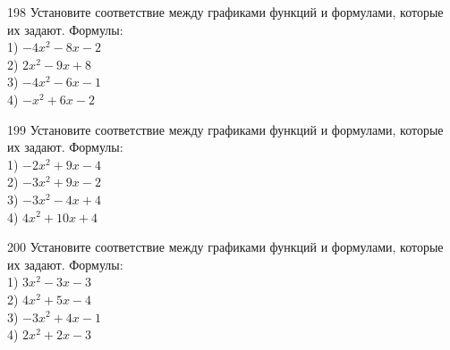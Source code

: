 \documentclass[4apaper]{article}
\begin{document}
\begin{taskBN}{198}
Установите соответствие между графиками функций и формулами, которые их задают. Формулы: \\1) $-4x^2-8x-2$\\2) $2x^2-9x+8$\\3) $-4x^2-6x-1$\\4) $-x^2+6x-2$
\end{taskBN}

\begin{taskBN}{199}
Установите соответствие между графиками функций и формулами, которые их задают. Формулы: \\1) $-2x^2+9x-4$\\2) $-3x^2+9x-2$\\3) $-3x^2-4x+4$\\4) $4x^2+10x+4$
\end{taskBN}

\begin{taskBN}{200}
Установите соответствие между графиками функций и формулами, которые их задают. Формулы: \\1) $3x^2-3x-3$\\2) $4x^2+5x-4$\\3) $-3x^2+4x-1$\\4) $2x^2+2x-3$
\end{taskBN}
\end{document}

